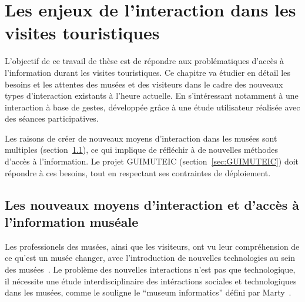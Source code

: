 \chapter{Les enjeux de l'interaction dans les visites touristiques}
\label{chap:etude}

L'objectif de ce travail de thèse est de répondre aux problématiques d'accès à l'information durant les visites touristiques. 
Ce chapitre va étudier en détail les besoins et les attentes des musées et des visiteurs dans le cadre des nouveaux types d'interaction existants à l'heure actuelle.
En s'intéressant notamment à une interaction à base de gestes, développée grâce à une étude utilisateur réalisée avec des séances participatives.

Les raisons de créer de nouveaux moyens d'interaction dans les musées sont multiples (section~\ref{sec:nouveauxmoyendinteraction}), ce qui implique de réfléchir à de nouvelles méthodes d'accès à l'information. 
Le projet GUIMUTEIC (section~\ref{sec:GUIMUTEIC}) doit répondre à ces besoins, tout en respectant ses contraintes de déploiement. 


\section{Les nouveaux moyens d'interaction et d'accès à l'information muséale}
\label{sec:nouveauxmoyendinteraction}

Les professionels des musées, ainsi que les visiteurs, ont vu leur compréhension de ce qu'est un musée changer, avec l'introduction de nouvelles technologies au sein des musées~\cite{knell2010shape}.
Le problème des nouvelles interactions n'est pas que technologique, il nécessite une étude interdisciplinaire des intéractions sociales et technologiques dans les musées, comme le souligne le ``museum informatics'' défini par Marty~\cite{marty2008museum}.


